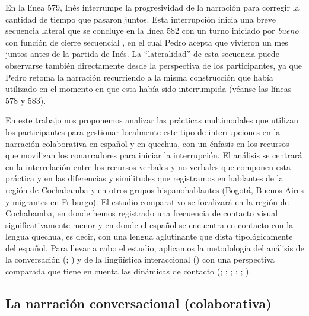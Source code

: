 \documentclass[output=paper]{../langscibook}
\begin{document}
En la línea 579, Inés interrumpe la progresividad de la narración para corregir la cantidad de tiempo que pasaron juntos. Esta interrupción inicia una breve secuencia lateral que se concluye en la línea 582 con un turno iniciado por \textit{bueno} \citep{Raymond2018} con función de cierre secuencial \citep{Park2010}, en el cual Pedro acepta que vivieron un mes juntos antes de la partida de Inés. La “lateralidad” de esta secuencia puede observarse también directamente desde la perspectiva de los participantes, ya que Pedro retoma la narración recurriendo a la misma construcción que había utilizado en el momento en que esta había sido interrumpida (véanse las líneas 578 y 583). 

En este trabajo nos proponemos analizar las prácticas multimodales que utilizan los participantes para gestionar localmente este tipo de interrupciones en la narración colaborativa en español y en quechua, con un énfasis en los recursos que movilizan los conarradores para iniciar la interrupción. El análisis se centrará en la interrelación entre los recursos verbales y no verbales que componen esta práctica y en las diferencias y similitudes que registramos en hablantes de la región de Cochabamba y en otros grupos hispanohablantes (Bogotá, Buenos Aires y migrantes en Friburgo). El estudio comparativo se focalizará en la región de Cochabamba, en donde hemos registrado una frecuencia de contacto visual significativamente menor y en donde el español se encuentra en contacto con la lengua quechua, es decir, con una lengua aglutinante que dista tipológicamente del español. Para llevar a cabo el estudio, aplicamos la metodología del análisis de la conversación (\citealt{Sacks1995}; \citealt{Schegloff2007}) y de la lingüística interaccional (\citealt{Couper-KuhlenSelting2017}) con una perspectiva comparada que tiene en cuenta las dinámicas de contacto (\citealt{MartínezSperanza2009}; \citealt{Pfänder2009};  \citealt{SotoRodríguez2013}; \citealt{Blestel2015habiasido}; \citealt{Dankel2015}; \citealt{PalaciosAlcaine2017book}).

\subsection{La narración conversacional (colaborativa)}
\end{document}
